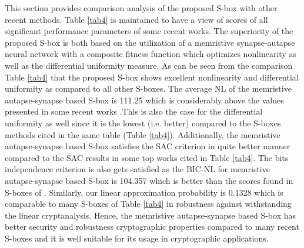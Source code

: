\documentclass[journal]{IEEEtran/IEEEtran}
\begin{document}
This section provides comparison analysis of the proposed S-box with other recent methods. Table \ref{tab4} is maintained to have a view of scores of all significant performance parameters of some recent works. The superiority of the proposed S-box is both based on the utilization of a memristive synapse-autapse neural network with a composite fitness function which optimizes nonlinearity as well as the differential uniformity measure. As can be seen from the comparison Table \ref{tab4} that the proposed S-box shows excellent nonlinearity and differential uniformity as compared to all other S-boxes. The average NL of the memristive autapse-synapse based S-box is 111.25 which is considerably above the values presented in some recent works \cite{zhang2018design,silva2018substitution,ccavucsouglu2022s,abd2019novel}.This is also the case for the differential uniformity as well since it is the lowest (i.e. better) compared to the S-boxes methods cited in the same table (Table \ref{tab4}). Additionally, the memristive autapse-synapse based S-box satisfies the SAC criterion in quite better manner compared to the SAC results in some top works cited in Table \ref{tab4}. The bits independence criterion is also gets satisfied as the BIC-NL for memristive autapse-synapse based S-box is 104.357 which is better than the scores found in S-boxes of \cite{zhang2018design,silva2018substitution,ccavucsouglu2022s,abd2019novel}. Similarly, our linear approximation probability is 0.1328 which is comparable to many S-boxes of Table \ref{tab4} in robustness against withstanding the linear cryptanalysis. Hence, the memristive autapse-synapse based S-box has better security and robustness cryptographic properties compared to many recent S-boxes and it is well suitable for its usage in cryptographic applications.


\begin{table}
	\centering
	\caption{Performance comparison of proposed S-box.}
	\label{tab4}
\end{table}
\end{document}
